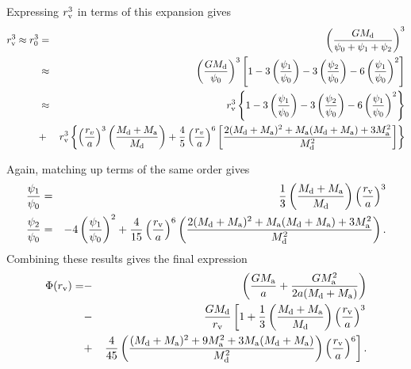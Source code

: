 \documentclass{aastex}
\newcommand{\be}{\begin{eqnarray}}
\newcommand{\ee}{\end{eqnarray}}
\newcommand{\rv}{r_{\rm v}}
\begin{document}
Expressing $r_{\rm v}^3$ in terms of this expansion gives 
\begin{eqnarray}
r_{\rm v}^3 \approx r_0^3 & = & \left( \frac{G M_{\rm d}}{\psi_0 + \psi_1 + \psi_2} \right)^3 \nonumber \\
	& \approx & \left( \frac{G M_{\rm d}}{\psi_0} \right)^3 \left[ 1 - 3 \left( \frac{\psi_1}{\psi_0} \right) - 3 \left( \frac{\psi_2}{\psi_0} \right) - 6 \left( \frac{\psi_1}{\psi_0} \right)^2 \right] \nonumber \\
	& \approx & r_{\rm v}^3 \left\{ 1 - 3 \left( \frac{\psi_1}{\psi_0} \right) - 3 \left( \frac{\psi_2}{\psi_0} \right) - 6 \left( \frac{\psi_1}{\psi_0} \right)^2 \right\} \nonumber \\ 
	& + &  r_{\rm v}^3 \left\{ \left( \frac{r_v}{a} \right)^3 \left( \frac{ M_{\rm d}+M_{\rm a} }{ M_{\rm d} } \right) + \frac{4}{5} \left( \frac{r_v}{a} \right)^6 \left[ \frac{ 2( M_{\rm d}+M_{\rm a} )^2 + M_{\rm a} (M_{\rm d}+M_{\rm a} )+ 3 M_{\rm a}^2}{M_{\rm d}^2} \right] \right\}
\label{eq:rv3_in_terms_of_potential_expansion}
\end{eqnarray}

Again, matching up terms of the same order gives
\be
\frac{\psi_1}{\psi_0} & = & \frac{1}{3} \left( \frac{ M_{\rm d}+M_{\rm a} }{ M_{\rm d} } \right) \left( \frac{r_{\rm v}}{a} \right)^3
\\
\frac{\psi_2}{\psi_0} & = & - 4 \left( \frac{\psi_1}{\psi_0}  \right)^2 + \frac{4}{15} \left( \frac{r_{\rm v}}{a} \right)^6
 \left( \frac{ 2(M_{\rm d}+M_{\rm a} )^2 + M_{\rm a} (M_{\rm d}+M_{\rm a} )
+ 3 M_{\rm a}^2}{M_{\rm d}^2} \right).
\ee
Combining these results gives the final expression
\be
\Phi(\rv) = &-& \left(  \frac{GM_{\rm a}}{a} + \frac{ GM_{\rm a}^2 }{2a(M_{\rm d}+M_{\rm a})} \right)
\nonumber \\ & - & 
 \frac{GM_{\rm d}}{\rv} \left[ 1 + \frac{1}{3} \left( \frac{M_{\rm d}+M_{\rm a}}{M_{\rm d}} \right) \left( \frac{\rv}{a} \right)^3
 \right. \nonumber \\ & + & \left.
 \frac{4}{45} \left( \frac{(M_{\rm d}+M_{\rm a})^2 + 9M_{\rm a}^2 + 3M_{\rm a}(M_{\rm d}+M_{\rm a})}{M_{\rm d}^2}\right) \left( \frac{\rv}{a} \right)^6
\right].
\label{eq:appendix_phi_vs_rv}
\ee





\end{document}
